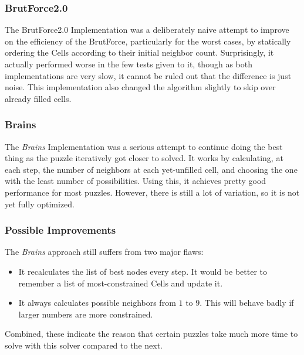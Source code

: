 \documentclass[letterpaper]{article}
\begin{document}
\subsubsection{BrutForce2.0}
The BrutForce2.0 Implementation was a deliberately naive attempt to improve on the efficiency of the BrutForce, particularly for the worst cases, by statically ordering the Cells according to their initial neighbor count. Surprisingly, it actually performed worse in the few tests given to it, though as both implementations are very slow, it cannot be ruled out that the difference is just noise. This implementation also changed the algorithm slightly to skip over already filled cells.

\subsubsection{Brains}
The \emph{Brains} Implementation was a serious attempt to continue doing the best thing as the puzzle iteratively got closer to solved. It works by calculating, at each step, the number of neighbors at each yet-unfilled cell, and choosing the one with the least number of possibilities. Using this, it achieves pretty good performance for most puzzles. However, there is still a lot of variation, so it is not yet fully optimized.

\subsubsection{Possible Improvements}
The \emph{Brains} approach still suffers from two major flaws:
\begin{itemize}
\item It recalculates the list of best nodes every step. It would be better to remember a list of most-constrained Cells and update it.
\item It always calculates possible neighbors from $ 1 $ to $ 9 $. This will behave badly if larger numbers are more constrained.
\end{itemize}
Combined, these indicate the reason that certain puzzles take much more time to solve with this solver compared to the next.
\end{document}
